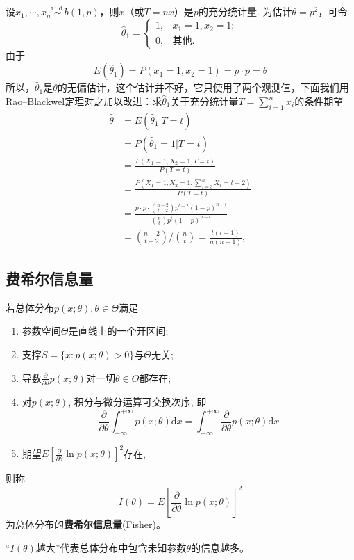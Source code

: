 \begin{example}
    设$x_1,\cdots,x_n\overset{\text{i.i.d.}}{\sim}b(1,p)$，则$\bar x$（或$T=n\bar x$）是$p$的充分统计量. 为估计$\theta=p^2$，可令
    \[      \hat\theta_1 = \begin{cases}
            1, & x_1=1, x_2=1; \\
            0, & \text{其他}.
        \end{cases}    \]
    由于
    \[ E(\hat\theta_1) = P(x_1=1,x_2=1) = p\cdot p =\theta \]
    所以，$\hat\theta_1$是$\theta$的无偏估计，这个估计并不好，它只使用了两个观测值，下面我们用Rao--Blackwel定理对之加以改进：求$\hat\theta_1$关于充分统计量$T=\sum_{i=1}^nx_i$的条件期望
    \begin{align*}
        \hat\theta & = E(\hat\theta_1 |T=t)                                                                 \\
                   & = P(\hat\theta_1 = 1 |T=t)                                                             \\
                   & = \frac{P(X_1=1,X_2=1,T=t)}{P(T=t)}                                                    \\
                   & = \frac{P( X_1=1,X_2=1,\sum_{i=3}^n X_i=t-2 )}{P(T=t)}                                 \\
                   & = \frac{p\cdot p\cdot \binom{n-2}{t-2}p^{t-2} (1-p)^{n-t}}{\binom{n}{t}p^t(1-p)^{n-t}} \\
                   & = \binom{n-2}{t-2}\big/\binom{n}{t} = \frac{t(t-1)}{n(n-1)},
    \end{align*}
\end{example}

\subsection{费希尔信息量}

\begin{definition}\label{def:Fisher}
    若总体分布$p(x ; \theta), \theta \in \Theta$满足
    \begin{enumerate}
        \item 参数空间$\Theta$是直线上的一个开区间;
        \item 支撑$S=\{x : p(x ; \theta)>0 \}$与$\Theta$无关;
        \item 导数$\frac{\partial}{\partial \theta} p(x ; \theta)$对一切$\theta\in\Theta$都存在;
        \item 对$p(x ; \theta)$, 积分与微分运算可交换次序, 即
              \[\frac{\partial}{\partial \theta} \int_{-\infty}^{+\infty} p(x ; \theta) \mathrm{d} x=\int_{-\infty}^{+\infty} \frac{\partial}{\partial \theta} p(x ; \theta) \mathrm{d} x\]
        \item 期望$E\left[\frac{\partial}{\partial \theta} \ln p(x ; \theta)\right]^{2}$存在,
    \end{enumerate}
    则称
    \[ I(\theta)=E\left[\frac{\partial}{\partial \theta} \ln p(x ; \theta)\right]^2 \]
    为总体分布的\textbf{费希尔信息量}(Fisher)。
\end{definition}
\begin{remark}
    “$I(\theta)$越大”代表总体分布中包含未知参数$\theta$的信息越多。
\end{remark}

